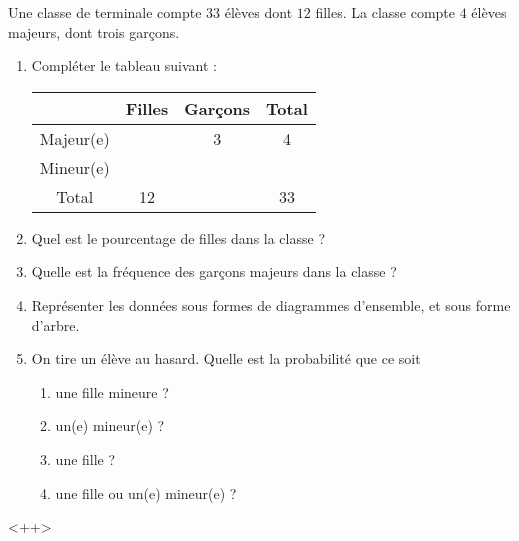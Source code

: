 
\begin{exercice}\label{exosmath-0219}

    Une classe de terminale compte \( 33\) élèves dont \( 12\) filles. La classe compte \( 4\) élèves majeurs, dont trois garçons.
    \begin{enumerate}
        \item
            Compléter le tableau suivant :
            \begin{center}
            \begin{tabular}[]{|c||c|c|c|}
                \hline
                &Filles&Garçons&Total\\
                \hline\hline
                Majeur(e)&&3&4\\\hline
                Mineur(e)&&&\\
                \hline
                Total&12&&33\\
                \hline
            \end{tabular}
            \end{center}
        \item
            Quel est le pourcentage de filles dans la classe ?
        \item
            Quelle est la fréquence des garçons majeurs dans la classe ?
        \item
            Représenter les données sous formes de diagrammes d'ensemble, et sous forme d'arbre.
        \item
            On tire un élève au hasard. Quelle est la probabilité que ce soit
            \begin{enumerate}
                \item
                    une fille mineure ?
                \item
                    un(e) mineur(e) ?
                \item
                    une fille ?
                \item
                    une fille ou un(e) mineur(e) ?
            \end{enumerate}
            
    \end{enumerate}
    <++>

\end{exercice}

